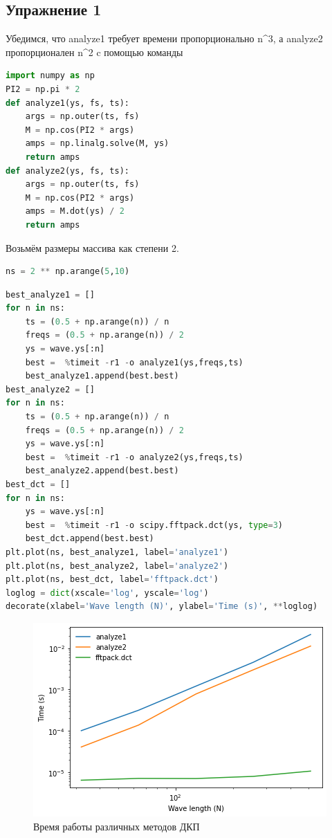 \subsection{Упражнение 1}

Убедимся, что analyze1 требует времени пропорционально n^3, а analyze2 пропорционален n^2 c помощью команды %

\begin{lstlisting}[language=Python]
import numpy as np
PI2 = np.pi * 2
def analyze1(ys, fs, ts):
    args = np.outer(ts, fs)
    M = np.cos(PI2 * args)
    amps = np.linalg.solve(M, ys)
    return amps
def analyze2(ys, fs, ts):
    args = np.outer(ts, fs)
    M = np.cos(PI2 * args)
    amps = M.dot(ys) / 2
    return amps
\end{lstlisting}

Возьмём размеры массива как степени 2.

\begin{lstlisting}[language=Python]
ns = 2 ** np.arange(5,10)
\end{lstlisting}

\begin{lstlisting}[language=Python]
best_analyze1 = []
for n in ns:
    ts = (0.5 + np.arange(n)) / n
    freqs = (0.5 + np.arange(n)) / 2
    ys = wave.ys[:n]
    best =  %timeit -r1 -o analyze1(ys,freqs,ts)
    best_analyze1.append(best.best)
best_analyze2 = []
for n in ns:
    ts = (0.5 + np.arange(n)) / n
    freqs = (0.5 + np.arange(n)) / 2
    ys = wave.ys[:n]
    best =  %timeit -r1 -o analyze2(ys,freqs,ts)
    best_analyze2.append(best.best)
best_dct = []
for n in ns:
    ys = wave.ys[:n]
    best =  %timeit -r1 -o scipy.fftpack.dct(ys, type=3)
    best_dct.append(best.best)
plt.plot(ns, best_analyze1, label='analyze1')
plt.plot(ns, best_analyze2, label='analyze2')
plt.plot(ns, best_dct, label='fftpack.dct')
loglog = dict(xscale='log', yscale='log')
decorate(xlabel='Wave length (N)', ylabel='Time (s)', **loglog)
\end{lstlisting}

\begin{figure}[H]
	\begin{center}
		\includegraphics[scale=1]{fig/lab06/lab06_1.png}
		\caption{Время работы различных методов ДКП}
	\end{center}
\end{figure}

